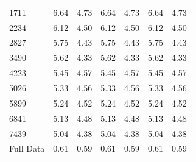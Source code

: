 \begin{table}[!htb]
{\begin{tabular}{l||rr|rr|rr}
                1711  &         6.64 &      4.73 &             6.64 &          4.73 &        6.64 &     4.73 \\
                2234  &         6.12 &      4.50 &             6.12 &          4.50 &        6.12 &     4.50 \\
                2827  &         5.75 &      4.43 &             5.75 &          4.43 &        5.75 &     4.43 \\
                3490  &         5.62 &      4.33 &             5.62 &          4.33 &        5.62 &     4.33 \\
                4223  &         5.45 &      4.57 &             5.45 &          4.57 &        5.45 &     4.57 \\
                5026  &         5.33 &      4.56 &             5.33 &          4.56 &        5.33 &     4.56 \\
                5899  &         5.24 &      4.52 &             5.24 &          4.52 &        5.24 &     4.52 \\
                6841  &         5.13 &      4.48 &             5.13 &          4.48 &        5.13 &     4.48 \\
                7439  &         5.04 &      4.38 &             5.04 &          4.38 &        5.04 &     4.38 \\
                Full Data &         0.61 &      0.59 &             0.61 &          0.59 &        0.61 &     0.59 \\
                \bottomrule
                \end{tabular}%
                }
                \end{table}
                
\label{sec:apdx:table}

